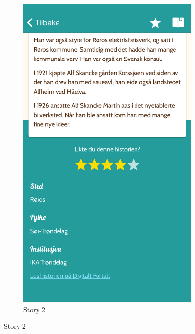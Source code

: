 \begin{appendices}
\begin{figure}[h]
\begin{subfigure}[h]{0.3\textwidth}
			\includegraphics[width=\textwidth]{fig/screenshot_story2}
			\caption{Story 2}
		\end{subfigure}
		

\end{figure}
\end{appendices}
